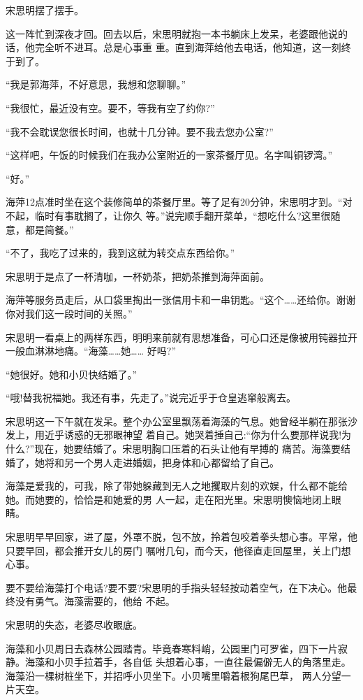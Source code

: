 \documentclass[11pt,a4paper,onecolumn]{article}
\begin{document}
宋思明摆了摆手。

这一阵忙到深夜才回。回去以后，宋思明就抱一本书躺床上发呆，老婆跟他说的话，他完全听不进耳。总是心事重
重。直到海萍给他去电话，他知道，这一刻终于到了。

``我是郭海萍，不好意思，我想和您聊聊。''

``我很忙，最近没有空。要不，等我有空了约你?''

``我不会耽误您很长时间，也就十几分钟。要不我去您办公室?''

``这样吧，午饭的时候我们在我办公室附近的一家茶餐厅见。名字叫铜锣湾。''

``好。''

海萍12点准时坐在这个装修简单的茶餐厅里。等了足有20分钟，宋思明才到。``对不起，临时有事耽搁了，让你久
等。''说完顺手翻开菜单，``想吃什么?这里很随意，都是简餐。''

``不了，我吃了过来的，我到这就为转交点东西给你。''

宋思明于是点了一杯清咖，一杯奶茶，把奶茶推到海萍面前。

海萍等服务员走后，从口袋里掏出一张信用卡和一串钥匙。``这个……还给你。谢谢你对我们这一段时间的关照。''

宋思明一看桌上的两样东西，明明来前就有思想准备，可心口还是像被用钝器拉开一般血淋淋地痛。``海藻……她……
好吗?''

``她很好。她和小贝快结婚了。''

``哦!替我祝福她。我还有事，先走了。''说完近乎于仓皇逃窜般离去。

宋思明这一下午就在发呆。整个办公室里飘荡着海藻的气息。她曾经半躺在那张沙发上，用近乎诱惑的无邪眼神望
着自己。她哭着捶自己:``你为什么要那样说我!为什么?''现在，她要结婚了。宋思明胸口压着的石头让他有早搏的
痛苦。海藻要结婚了，她将和另一个男人走进婚姻，把身体和心都留给了自己。

海藻是爱我的，可我，除了带她躲藏到无人之地攫取片刻的欢娱，什么都不能给她。而她要的，恰恰是和她爱的男
人一起，走在阳光里。宋思明懊恼地闭上眼睛。

宋思明早早回家，进了屋，外罩不脱，包不放，拎着包咬着拳头想心事。平常，他只要早回，都会推开女儿的房门
嘱咐几句，而今天，他径直走回屋里，关上门想心事。

要不要给海藻打个电话?要不要?宋思明的手指头轻轻按动着空气，在下决心。他最终没有勇气。海藻需要的，他给
不起。

宋思明的失态，老婆尽收眼底。

海藻和小贝周日去森林公园踏青。毕竟春寒料峭，公园里门可罗雀，四下一片寂静。海藻和小贝手拉着手，各自低
头想着心事，一直往最偏僻无人的角落里走。海藻沿一棵树桩坐下，并招呼小贝坐下。小贝嘴里嚼着根狗尾巴草，
两人分望一片天空。
\end{document}
